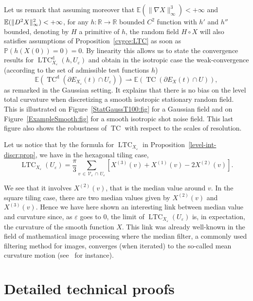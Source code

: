 \documentclass[AHL,Unicode,longabstracts,published]{cedram}
\newcommand{\R}{\mathbb{R}}
\newcommand{\bbP}{\mathbb{P}}
\newcommand{\E}{\mathbb{E}}
\newcommand{\eps}{\varepsilon}
\DeclareMathOperator{\TC}{TC}
\DeclareMathOperator{\LTC}{LTC}
\newcommand{\dd}{\mathrm{d}}
\newcommand{\calV}{\mathcal{V}}
\begin{document}
Let us remark that assuming moreover that $\E(\|\nabla X\|_\infty^3)<+\infty$ and $\E(\|D^2 X\|_\infty^2)\linebreak <+\infty$, for any $h:\R\rightarrow \R$ bounded $C^2$ function with $h'$ and $h''$ bounded, denoting by $H$ a primitive of $h$, the random field $H\circ X$ will also satisfies assumptions of Proposition~\ref{cvgce:LTC} as soon as $\bbP(h(X(0))=0)=0$. By linearity this allows us to state the convergence results for $\LTC^\dd_{X_\eps}(h,U_\eps)$ and obtain in the isotropic case the weak-convergence (according to the set of admissible test functions $h$)
\[
\E\left(\TC^\dd\left(\partial E_{X_\eps}(t)\cap U_\eps\right)\right)\rightharpoonup
\E\left(\TC(\partial E_{X}(t) \cap U)\right),
\]
as remarked in the Gaussian setting. It explains that there is no bias on the level total curvature when discretizing a smooth isotropic stationary random field. This is illustrated on Figure~\ref{StatGaussT100:fig} for a Gaussian field and on Figure~\ref{ExampleSmooth:fig} for a smooth isotropic shot noise field. This last figure also shows the robustness of $\TC$ with respect to the scales of resolution.



\begin{rema}
Let us notice that by the formula for $\LTC_{X_\eps}$ in Proposition~\ref{level-int-discr:prop}, we have in the hexagonal tiling case,
\[
\LTC_{X_\eps}(U_\eps)=\frac{\pi}{3}\sum_{v\,\in\, {\calV}_\eps\,\cap\,U_\eps} \left[X^{(3)}(v)+X^{(1)}(v)-2X^{(2)}(v)\right].
\]
\end{rema}

We see that it involves $X^{(2)}(v)$, that is the median value around $v$. In the square tiling case, there are two median values given by $X^{(2)}(v)$ and $X^{(3)}(v)$. Hence we have here shown an interesting link between median value and curvature since, as $\eps$ goes to $0$, the limit of $\LTC_{X_\eps}(U_\eps)$ is, in expectation, the curvature of the smooth function $X$. This link was already well-known in the field of mathematical image processing where the median filter, a commonly used filtering method for images, converges (when iterated) to the so-called mean curvature motion (see~\cite{Cao03a} for instance).
\vspace{10em}
\appendix
\section{Detailed technical proofs}
\end{document}
